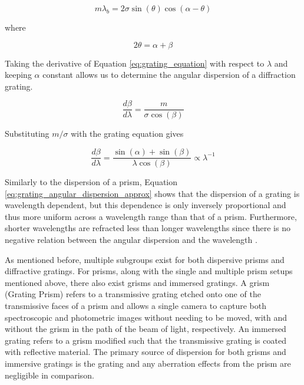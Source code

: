 \begin{equation}
	m\lambda_{b} = 2\sigma\sin(\theta)\cos(\alpha - \theta)
    \label{eq:blaze_wavelength}
\end{equation}

\noindent where

\begin{equation}
    2\theta = \alpha + \beta
\end{equation}

Taking the derivative of Equation \ref{eq:grating_equation} with respect to $\lambda$ and keeping $\alpha$ constant allows us to determine the angular dispersion of a diffraction grating.

\begin{equation}
    \frac{d\beta}{d\lambda} = \frac{m}{\sigma \cos(\beta)}
    \label{eq:grating_angular_dispersion}
\end{equation}

\noindent Substituting $m / \sigma$ with the grating equation gives

\begin{equation}
    \frac{d\beta}{d\lambda} = \frac{\sin(\alpha) + \sin(\beta)}{\lambda \cos(\beta)} \propto \lambda^{-1}
    \label{eq:grating_angular_dispersion_approx}
\end{equation}

Similarly to the dispersion of a prism, Equation \ref{eq:grating_angular_dispersion_approx} shows that the dispersion of a grating is wavelength dependent, but this dependence is only inversely proportional and thus more uniform across a wavelength range than that of a prism. Furthermore, shorter wavelengths are refracted less than longer wavelengths since there is no negative relation between the angular dispersion and the wavelength \citep{BirneyObsAstro, Hecht_optics}.
\prgph

As mentioned before, multiple subgroups exist for both dispersive prisms and diffractive gratings. For prisms, along with the single and multiple prism setups mentioned above, there also exist grisms and immersed gratings. A grism (Grating Prism) refers to a transmissive grating etched onto one of the transmissive faces of a prism and allows a single camera to capture both spectroscopic and photometric images without needing to be moved, with and without the grism in the path of the beam of light, respectively. An immersed grating refers to a grism modified such that the transmissive grating is coated with reflective material. The primary source of dispersion for both grisms and immersive gratings is the grating and any aberration effects from the prism are negligible in comparison.
\prgph

